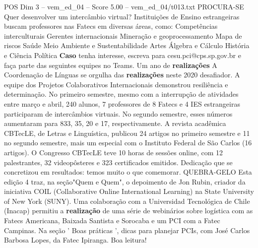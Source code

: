 \begin{textsample}{POS Dim 3 – vem\_ed\_04 – Score 5.00 – vem\_ed\_04/t013.txt}  \label{ex:f3_pos_147}
PROCURA-SE Quer desenvolver um intercâmbio virtual?
Instituições de Ensino estrangeiras buscam professores nas Fatecs em diversas áreas, como: Competências interculturais Gerentes internacionais Mineração e geoprocessamento Mapa de riscos Saúde Meio Ambiente e Sustentabilidade Artes Álgebra e Cálculo História e Ciência Política \textbf{Caso} tenha interesse, escreva para cesu.pci@cps.sp.gov.br e faça parte das seguintes equipes no Teams.
Um ano de \textbf{realizações} A Coordenação de Línguas se orgulha das \textbf{realizações} neste 2020 desafiador.
A equipe dos Projetos Colaborativos Internacionais demonstrou resiliência e determinação.
No primeiro semestre, mesmo com a interrupção de atividades entre março e abril, 240 alunos, 7 professores de 8 Fatecs e 4 IES estrangeiras participaram de intercâmbios virtuais.
No segundo semestre, esses números aumentaram para 833, 35, 20 e 17, respectivamente.
A revista acadêmica CBTecLE, de Letras e Linguística, publicou 24 artigos no primeiro semestre e 11 no segundo semestre, mais um especial com o Instituto Federal de São Carlos (16 artigos).
O Congresso CBTecLE teve 10 horas de sessões online, com 12 palestrantes, 32 videopôsteres e 323 certificados emitidos.
Dedicação que se concretizou em resultados: temos muito o que comemorar.
QUEBRA-GELO Esta edição 4 traz, na seção"Quem e Quem", o depoimento de Jon Rubin, criador da iniciativa COIL (Collaborative Online International Learning) na State University of New York (SUNY).
Uma colaboração com a Universidad Tecnológica de Chile (Inacap) permitiu a \textbf{realização} de uma série de webinários sobre logística com as Fatecs Americana, Baixada Santista e Sorocaba e um PCI com a Fatec Campinas.
Na seção ' Boas práticas ', dicas para planejar PCIs, com José Carlos Barbosa Lopes, da Fatec Ipiranga.
Boa leitura!

\end{textsample}

